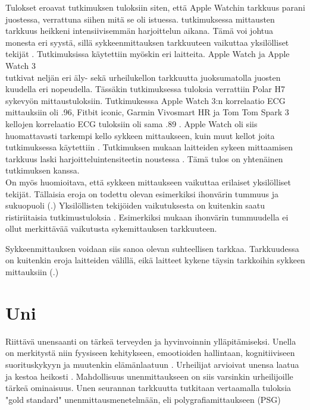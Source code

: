 \documentclass[utf8,bachelor,finnish]{bachelor}
\begin{document}
  Tulokset eroavat \textcite{wang_accuracy_2017} tutkimuksen tuloksiin siten, että Apple Watchin tarkkuus parani juostessa, verrattuna siihen mitä se oli istuessa. \textcite{wang_accuracy_2017} tutkimuksessa
   mittausten tarkkuus heikkeni intensiivisemmän harjoittelun aikana. Tämä voi johtua monesta eri syystä, sillä sykkeenmittauksen tarkkuuteen vaikuttaa yksilölliset tekijät \parencite{koerber_accuracy_2022,pasadyn_accuracy_2019,hochstadt_continuous_2020}. Tutkimuksissa käytettiin myöskin eri laitteita.
    Apple Watch ja Apple Watch 3\\

  \textcite{pasadyn_accuracy_2019} tutkivat neljän eri äly- sekä urheilukellon tarkkuutta juoksumatolla juosten kuudella eri nopeudella. Tässäkin tutkimuksessa tuloksia verrattiin
   Polar H7 sykevyön mittaustuloksiin. Tutkimukesssa Apple Watch 3:n korrelaatio ECG mittauksiin oli .96, Fitbit iconic, Garmin Vivosmart HR ja Tom Tom Spark 3
    kellojen korrelaatio ECG tuloksiin oli sama .89 \parencite{pasadyn_accuracy_2019}. Apple Watch oli siis huomattavasti tarkempi kello sykkeen mittaukseen,
     kuin muut kellot joita tutkimuksessa käytettiin \parencite{pasadyn_accuracy_2019}. Tutkimuksen mukaan laitteiden sykeen mittaamisen tarkkuus laski
      harjoitteluintensiteetin noustessa \parencite{pasadyn_accuracy_2019}. Tämä tulos on yhtenäinen \textcite{wang_accuracy_2017} tutkimuksen kanssa.\\
  
   On myös huomioitava, että sykkeen mittaukseen vaikuttaa erilaiset yksilölliset tekijät. Tällaisia eroja on todettu olevan esimerkiksi ihonvärin tummuus ja sukuopuoli (\cite{shcherbina_accuracy_2017,hochstadt_continuous_2020}.)
    Yksilöllisten tekijöiden vaikutuksesta on kuitenkin saatu ristiriitaisia tutkimustuloksia \parencite{pasadyn_accuracy_2019}. Esimerkiksi \cite{sanudo_pilot_2019, bent_investigating_2020} mukaan ihonvärin tummuudella ei ollut merkittävää
     vaikutusta sykemittauksen tarkkuuteen.
    
   Sykkeenmittauksen voidaan siis sanoa olevan suhteellisen tarkkaa. Tarkkuudessa on kuitenkin eroja laitteiden välillä, eikä laitteet kykene täysin tarkkoihin sykkeen mittauksiin (\cite{pasadyn_accuracy_2019,wang_accuracy_2017,nelson_accuracy_2019}.)  

  \section{Uni}
  Riittävä unensaanti on tärkeä terveyden ja hyvinvoinnin ylläpitämiseksi. Unella on merkitystä niin fyysiseen kehitykseen,
   emootioiden hallintaan, kognitiiviseen suorituskykyyn ja muutenkin elämänlaatuun \parencite{watson_sleep_2017}. 
    Urheilijat arvioivat unensa laatua ja kestoa heikosti \parencite{watson_sleep_2017}. Mahdollisuus unenmittaukseen
     on siis varsinkin urheilijoille tärkeä ominaisuus. Unen seurannan tarkkuutta tutkitaan vertaamalla tuloksia "gold standard"
      unenmittausmenetelmään, eli polygrafiamittaukseen (PSG) \parencite{de_zambotti_measures_2016, rundo_chapter_2019, miller_validation_2022}\\
\end{document}
